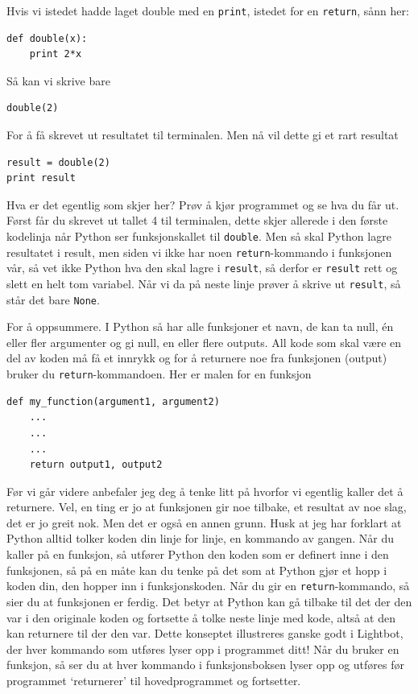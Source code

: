 \documentclass[a4paper, 11pt, notitlepage]{article}
\begin{document}
Hvis vi istedet hadde laget double med en \verb+print+, istedet for en \verb+return+, sånn her:
\begin{lstlisting}
def double(x):
	print 2*x
\end{lstlisting}
Så kan vi skrive bare
\begin{lstlisting}
double(2)
\end{lstlisting}
For å få skrevet ut resultatet til terminalen. Men nå vil dette gi et rart resultat
\begin{lstlisting}
result = double(2)
print result
\end{lstlisting}
Hva er det egentlig som skjer her? Prøv å kjør programmet og se hva du får ut. Først får du skrevet ut tallet 4 til terminalen, dette skjer allerede i den første kodelinja når Python ser funksjonskallet til \verb+double+. Men så skal Python lagre resultatet i result, men siden vi ikke har noen \verb+return+-kommando i funksjonen vår, så vet ikke Python hva den skal lagre i \verb+result+, så derfor er \verb+result+ rett og slett en helt tom variabel. Når vi da på neste linje prøver å skrive ut \verb+result+, så står det bare \verb+None+.



For å oppsummere. I Python så har alle funksjoner et navn, de kan ta null, én eller fler argumenter og gi null, en eller flere outputs. All kode som skal være en del av koden må få et innrykk og for å returnere noe fra funksjonen (output) bruker du \verb+return+-kommandoen. Her er malen for en funksjon
\begin{lstlisting}
def my_function(argument1, argument2)
	...
	...
	...
	return output1, output2
\end{lstlisting}

Før vi går videre anbefaler jeg deg å tenke litt på hvorfor vi egentlig kaller det å returnere. Vel, en ting er jo at funksjonen gir noe tilbake, et resultat av noe slag, det er jo greit nok. Men det er også en annen grunn. Husk at jeg har forklart at Python alltid tolker koden din linje for linje, en kommando av gangen. Når du kaller på en funksjon, så utfører Python den koden som er definert inne i den funksjonen, så på en måte kan du tenke på det som at Python gjør et hopp i koden din, den hopper inn i funksjonskoden. Når du gir en \verb+return+-kommando, så sier du at funksjonen er ferdig. Det betyr at Python kan gå tilbake til det der den var i den originale koden og fortsette å tolke neste linje med kode, altså at den kan returnere til der den var. Dette konseptet illustreres ganske godt i Lightbot, der hver kommando som utføres lyser opp i programmet ditt! Når du bruker en funksjon, så ser du at hver kommando i funksjonsboksen lyser opp og utføres før programmet `returnerer' til hovedprogrammet og fortsetter.
\end{document}
